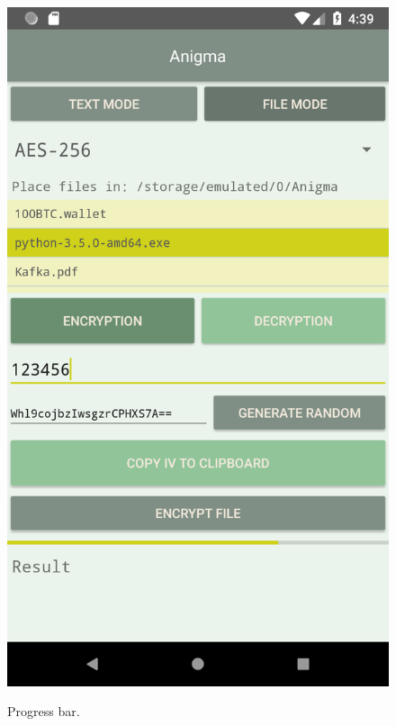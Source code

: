 \documentclass[12pt, a4paper]{article}
\begin{document}
\begin{figure}[h]
\caption{Progress bar.}
\centering
\includegraphics[height=0.4\textheight]{progress}
\label{fig:progress}
\end{figure}
\end{document}
